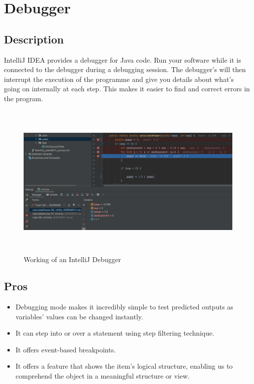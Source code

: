 \documentclass{article}
\begin{document}
    \section{Debugger}
    \subsection{Description}
    IntelliJ IDEA provides a debugger for Java code. Run your software while it is connected to the debugger during a debugging session. The debugger's will then interrupt the execution of the programme and give you details about what's going on internally at each step. This makes it easier to find and correct errors in the program.
    \begin{figure}[hbt!]
        \centering
        \includegraphics[width=5.0in,height=3.0in]{Images/Debugger.png}
        \caption{Working of an IntelliJ Debugger}
        \label{fig:Speed vs. Torque from Pittman}
    \end{figure}
    \subsection{Pros}
    \begin{itemize}
        \item Debugging mode makes it incredibly simple to test predicted outputs as variables' values can be changed instantly.
        \item It can step into or over a statement using step filtering technique.
        \item It offers event-based breakpoints.
        \item It offers a feature that shows the item's logical structure, enabling us to comprehend the object in a meaningful structure or view.
    \end{itemize}
\end{document}
